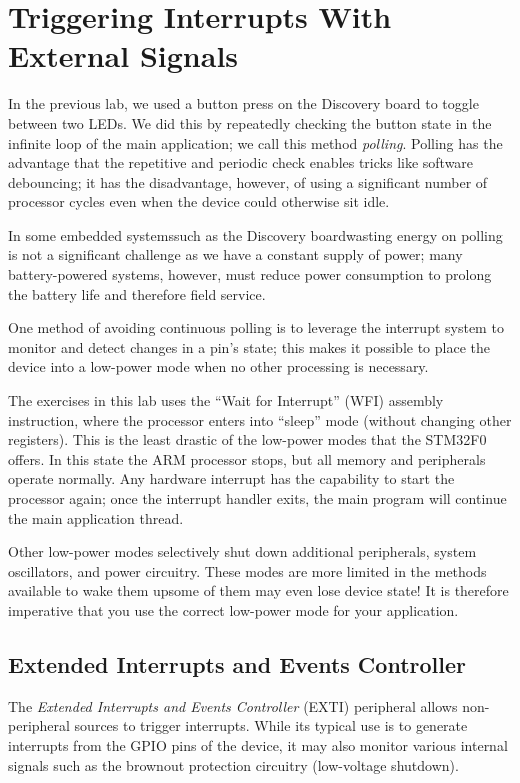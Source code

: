 \documentclass[11pt,fleqn]{book} %
\begin{document}
\section{Triggering Interrupts With External Signals}

In the previous lab, we used a button press on the Discovery board to toggle between two LEDs. We did this by repeatedly checking the button state in the infinite loop of the main application; we call this method \textit{polling}. Polling has the advantage that the repetitive and periodic check enables tricks like software debouncing; it has the disadvantage, however, of using a significant number of processor cycles even when the device could otherwise sit idle. 

In some embedded systems\textemdash such as the Discovery board\textemdash wasting energy on polling is not a significant challenge as we have a constant supply of power; many battery-powered systems, however, must reduce power consumption to prolong the battery life and therefore field service.

One method of avoiding continuous polling is to leverage the interrupt system to monitor and detect changes in a pin's state; this makes it possible to place the device into a low-power mode when no other processing is necessary. 

The exercises in this lab uses the ``Wait for Interrupt'' (WFI) assembly instruction, where the processor enters into ``sleep'' mode (without changing other registers). This is the least drastic of the low-power modes that the STM32F0 offers. In this state the ARM processor stops, but all memory and peripherals operate normally. Any hardware interrupt has the capability to start the processor again; once the interrupt handler exits, the main program will continue the main application thread. 

Other low-power modes selectively shut down additional peripherals, system oscillators, and power circuitry. These modes are more limited in the methods available to wake them up\textemdash some of them may even lose device state! It is therefore imperative that you use the correct low-power mode for your application.  

\subsection{Extended Interrupts and Events Controller} \label{exti}

The \textit{Extended Interrupts and Events Controller} (EXTI) peripheral allows non-peripheral sources to trigger interrupts. While its typical use is to generate interrupts from the GPIO pins of the device, it may also monitor various internal signals such as the brownout protection circuitry (low-voltage shutdown).
\end{document}
